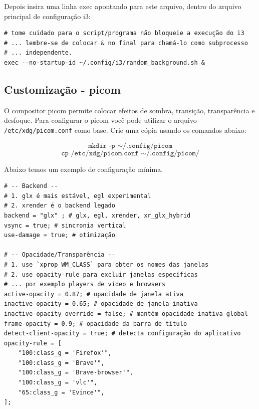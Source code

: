 \documentclass[12pt,a4paper]{article}
\begin{document}
\vspace{\baselineskip}

Depois insira uma linha exec apontando para este arquivo, dentro do arquivo principal de configuração i3:\\

\begin{lstlisting}
# tome cuidado para o script/programa não bloqueie a execução do i3
# ... lembre-se de colocar & no final para chamá-lo como subprocesso
# ... independente.
exec --no-startup-id ~/.config/i3/random_background.sh &
\end{lstlisting}

\subsection{Customização - picom}

\hspace{\baselineskip}

O compositor picom permite colocar efeitos de sombra, transição, transparência e desfoque. Para configurar o picom você pode utilizar o arquivo \texttt{/etc/xdg/picom.conf} como base. Crie uma cópia usando os comandos abaixo: 

$$ \texttt{mkdir -p $\sim$/.config/picom} $$
$$ \texttt{cp /etc/xdg/picom.conf $\sim$/.config/picom/} $$

\vspace{\baselineskip}

Abaixo temos um exemplo de configuração mínima.\\

\begin{lstlisting}
# -- Backend --
# 1. glx é mais estável, egl experimental
# 2. xrender é o backend legado 
backend = "glx" ; # glx, egl, xrender, xr_glx_hybrid 
vsync = true; # sincronia vertical
use-damage = true; # otimização

# -- Opacidade/Transparência --
# 1. use `xprop WM_CLASS` para obter os nomes das janelas
# 2. use opacity-rule para excluir janelas específicas
# ... por exemplo players de vídeo e browsers 
active-opacity = 0.87; # opacidade de janela ativa
inactive-opacity = 0.65; # opacidade de janela inativa
inactive-opacity-override = false; # mantém opacidade inativa global
frame-opacity = 0.9; # opacidade da barra de título
detect-client-opacity = true; # detecta configuração do aplicativo
opacity-rule = [
    "100:class_g = 'Firefox'",
    "100:class_g = 'Brave'",
    "100:class_g = 'Brave-browser'",
	"100:class_g = 'vlc'",
    "65:class_g = 'Evince'",
];
\end{lstlisting}
\end{document}
